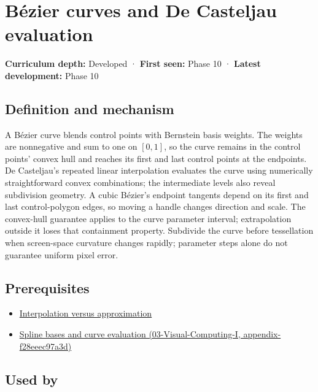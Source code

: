 \hypertarget{appendix-ddbec701898c}{}
\section{Bézier curves and De Casteljau evaluation}\label{appendix-ddbec701898c-buxe9zier-curves-and-de-casteljau-evaluation}

\textbf{Curriculum depth:} Developed · \textbf{First seen:} Phase 10 · \textbf{Latest development:} Phase 10

\subsection{Definition and mechanism}\label{appendix-ddbec701898c-definition-and-mechanism}

A Bézier curve blends control points with Bernstein basis weights. The weights are nonnegative and sum to one on \([0,1]\), so the curve remains in the control points' convex hull and reaches its first and last control points at the endpoints. De Casteljau's repeated linear interpolation evaluates the curve using numerically straightforward convex combinations; the intermediate levels also reveal subdivision geometry. A cubic Bézier's endpoint tangents depend on its first and last control-polygon edges, so moving a handle changes direction and scale. The convex-hull guarantee applies to the curve parameter interval; extrapolation outside it loses that containment property. Subdivide the curve before tessellation when screen-space curvature changes rapidly; parameter steps alone do not guarantee uniform pixel error.

\subsection{Prerequisites}\label{appendix-ddbec701898c-prerequisites}

\begin{itemize}
\tightlist
\item
  \hyperref[appendix-0c2a5f69851e]{Interpolation versus approximation}
\item
  \href{../03-Visual-Computing-I/main.pdf\#nameddest=appendix-f28eeec97a3d}{Spline bases and curve evaluation (03-Visual-Computing-I, appendix-f28eeec97a3d)}
\end{itemize}

\subsection{Used by}\label{appendix-ddbec701898c-used-by}

